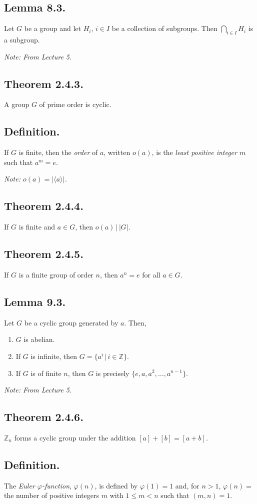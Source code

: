 \documentclass{article}
\newenvironment{thm}[1]{\subsection*{Theorem #1.}}{}
\newenvironment{lemma}[1]{\subsection*{Lemma #1.}}{}
\newenvironment{defn}{\subsection*{Definition.}}{}
\newcommand*{\Z}{\mathbb{Z}}
\begin{document}
\begin{lemma}{8.3}
    Let $G$ be a group and let $H_i$, $i \in I$ be a collection of subgroups. Then $\bigcap_{i \in I} H_i$ is a subgroup.

    \textit{Note: From Lecture 5.}
\end{lemma}

\begin{thm}{2.4.3}
    A group $G$ of prime order is cyclic.
\end{thm}

\begin{defn}
    If $G$ is finite, then the \textit{order} of $a$, written $o(a)$, is the \textit{least positive integer $m$} such that $a^m = e$.

    \textit{Note: $o(a) = |\langle a \rangle|$.}
\end{defn}

\begin{thm}{2.4.4}
    If $G$ is finite and $a \in G$, then $o(a) \, | \, |G|$.
\end{thm}

\begin{thm}{2.4.5}
    If $G$ is a finite group of order $n$, then $a^n = e$ for all $a \in G$.
\end{thm}

\begin{lemma}{9.3}
    Let $G$ be a cyclic group generated by $a$. Then,
    \begin{enumerate}[label=(\alph*)]
        \item $G$ is abelian.
        \item If $G$ is infinite, then $G = \{a^i \, | \, i \in \Z\}$.
        \item If $G$ is of finite $n$, then $G$ is precisely $\{e, a, a^2, \dots, a^{n - 1}\}$.
    \end{enumerate}

    \textit{Note: From Lecture 5.}
\end{lemma}

\begin{thm}{2.4.6}
    $\Z_n$ forms a cyclic group under the addition $[a] + [b] = [a + b]$.
\end{thm}

\begin{defn}
    The \textit{Euler $\varphi$-function}, $\varphi(n)$, is defined by $\varphi(1) = 1$ and, for $n > 1$, $\varphi(n) = $ the number of positive integers $m$ with $1 \leq m < n$ such that $(m, n) = 1$.
\end{defn}
\end{document}
